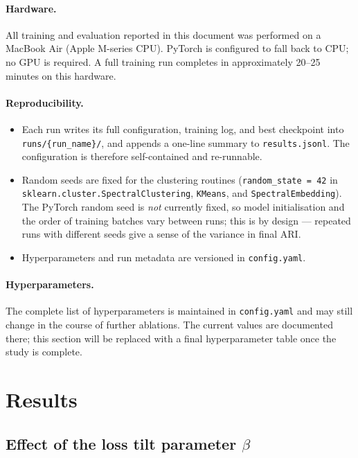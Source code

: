 \documentclass[12pt, a4paper]{article}
\begin{document}
\paragraph{Hardware.}
All training and evaluation reported in this document was performed on a MacBook Air
(Apple M-series CPU). PyTorch is configured to fall back to CPU; no GPU is required.
A full training run completes in approximately 20--25 minutes on this hardware.

\paragraph{Reproducibility.}
\begin{itemize}
    \item Each run writes its full configuration, training log, and best checkpoint
          into \texttt{runs/\{run\_name\}/}, and appends a one-line summary to
          \texttt{results.jsonl}. The configuration is therefore self-contained and
          re-runnable.
    \item Random seeds are fixed for the clustering routines
          (\texttt{random\_state = 42} in \texttt{sklearn.cluster.SpectralClustering},
          \texttt{KMeans}, and \texttt{SpectralEmbedding}). The PyTorch random seed is
          \emph{not} currently fixed, so model initialisation and the order of training
          batches vary between runs; this is by design --- repeated runs with different
          seeds give a sense of the variance in final ARI.
    \item Hyperparameters and run metadata are versioned in \texttt{config.yaml}.
\end{itemize}

\paragraph{Hyperparameters.}
The complete list of hyperparameters is maintained in \texttt{config.yaml} and may
still change in the course of further ablations. The current values are documented
there; this section will be replaced with a final hyperparameter table once the
study is complete.

\section{Results}

\subsection{Effect of the loss tilt parameter $\beta$}
\end{document}
